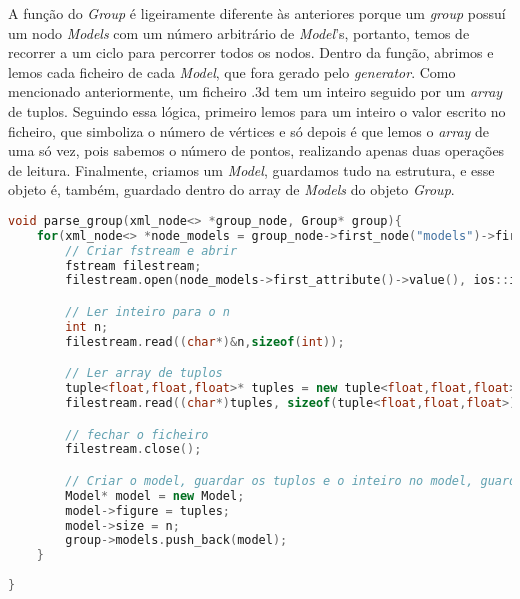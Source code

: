 \documentclass[14pt, a4 paper]{report}
\begin{document}
A função do \textit{Group} é ligeiramente diferente às anteriores porque um \textit{group} possuí um nodo \textit{Models} com um número arbitrário de \textit{Model}'s, portanto, temos de recorrer a um ciclo para percorrer todos os nodos. Dentro da função, abrimos e lemos cada ficheiro de cada \textit{Model}, que fora gerado pelo \textit{generator}.
Como mencionado anteriormente, um ficheiro .3d tem um inteiro seguido por um \textit{array} de tuplos. Seguindo essa lógica, primeiro lemos para um inteiro o valor escrito no ficheiro, que simboliza o número de vértices e só depois é que lemos o \textit{array} de uma só vez, pois sabemos o número de pontos, realizando apenas duas operações de leitura. Finalmente, criamos um \textit{Model}, guardamos tudo na estrutura, e esse objeto é, também, guardado dentro do array de \textit{Models} do objeto \textit{Group}.
\begin{lstlisting}[language = c++]
void parse_group(xml_node<> *group_node, Group* group){
    for(xml_node<> *node_models = group_node->first_node("models")->first_node();node_models; node_models = node_models->next_sibling()){
        // Criar fstream e abrir
        fstream filestream;
        filestream.open(node_models->first_attribute()->value(), ios::in|ios::binary);

        // Ler inteiro para o n
        int n;
        filestream.read((char*)&n,sizeof(int));

        // Ler array de tuplos
        tuple<float,float,float>* tuples = new tuple<float,float,float>[n];
        filestream.read((char*)tuples, sizeof(tuple<float,float,float>) * n);

        // fechar o ficheiro
        filestream.close();

        // Criar o model, guardar os tuplos e o inteiro no model, guardar o model no group
        Model* model = new Model;
        model->figure = tuples;
        model->size = n;
        group->models.push_back(model);
    }
    
}
\end{lstlisting}
\end{document}
